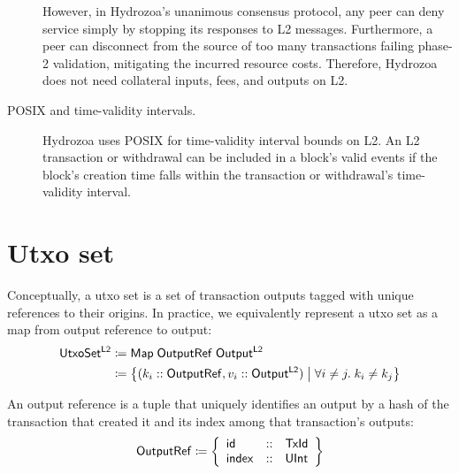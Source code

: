 \documentclass[../hydrozoa.tex]{subfiles}
\begin{document}
\begin{description}
      However, in Hydrozoa's unanimous consensus protocol, any peer can deny service simply by stopping its responses to L2 messages.
      Furthermore, a peer can disconnect from the source of too many transactions failing phase-2 validation, mitigating the incurred resource costs.
      Therefore, Hydrozoa does not need collateral inputs, fees, and outputs on L2.
    \item[POSIX and time-validity intervals.]
      Hydrozoa uses POSIX for time-validity interval bounds on L2.
      An L2 transaction or withdrawal can be included in a block's valid events if the block's creation time falls within the transaction or withdrawal's time-validity interval.
\end{description}

\section{Utxo set}%
\label{h:l2-utxo-set}%

Conceptually, a utxo set is a set of transaction outputs tagged with unique references to their origins.
In practice, we equivalently represent a utxo set as a map from output reference to output:
\begin{equation*}
\begin{split}
  \mathsf{UtxoSet^{L2}} &\coloneq \mathsf{Map} \; \mathsf{OutputRef} \; \mathsf{Output^{L2}} \\
    &\coloneq \left\{
      (k_i :: \mathsf{OutputRef}, v_i :: \mathsf{Output^{L2}})
      \;\middle|\;
      \forall i \neq j.\; k_i \neq k_j
    \right\}
\end{split}
\end{equation*}

An output reference is a tuple that uniquely identifies an output by a hash of the transaction that created it and its index among that transaction's outputs:
\begin{equation*}
  \mathsf{OutputRef} \coloneq \left\{
    \begin{array}{lll}
      \mathsf{id} &::& \mathsf{TxId} \\
      \mathsf{index} &::& \mathsf{UInt}
    \end{array} \right\}
\end{equation*}
\end{document}
